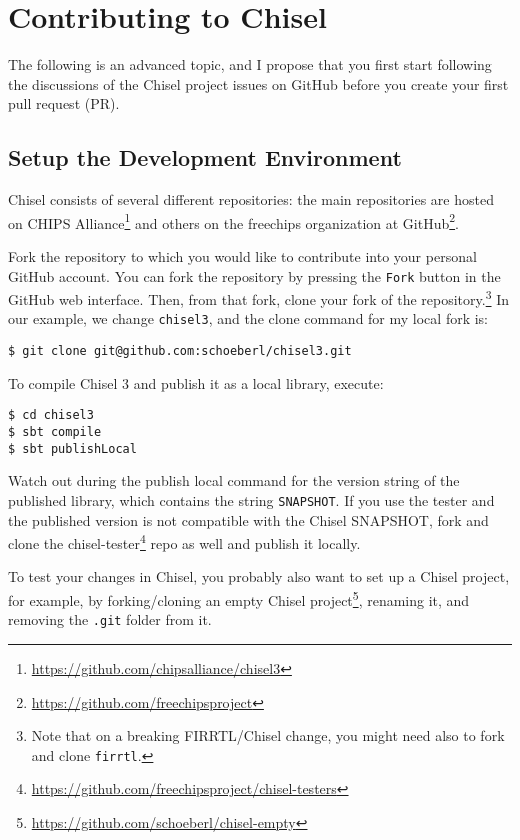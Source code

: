 \documentclass[%
    10pt,
    headinclude, footexclude,
    openright, %
    notitlepage,
    cleardoubleempty,
    headsepline,
    pointlessnumbers,
    bibtotoc, idxtotoc,
    ]{scrbook}
\newcommand{\code}[1]{{\lstinline[basicstyle=\small\ttfamily]{#1}}}
\newcommand{\myref}[2]{\href{#1}{#2}}
\renewcommand{\myref}[2]{{#2}{\footnote{\url{#1}}}}
\begin{document}
\section{Contributing to Chisel}

The following is an advanced topic, and I propose that you first start following the discussions
of the Chisel project issues on GitHub before you create your first pull request (PR).

\subsection{Setup the Development Environment}

Chisel consists of several different repositories: the main repositories are hosted on
\myref{https://github.com/chipsalliance/chisel3}{CHIPS Alliance} and others on
the \myref{https://github.com/freechipsproject}{freechips organization at GitHub}.

Fork the repository to which you would like to contribute into your personal GitHub account.
You can fork the repository by pressing the \code{Fork} button in the GitHub web interface.
Then, from that fork, clone your fork of the repository.\footnote{Note that on a breaking
FIRRTL/Chisel change, you might need also to fork and clone \code{firrtl}.}
In our example, we change \code{chisel3}, and the clone command for my local fork is:

\begin{verbatim}
$ git clone git@github.com:schoeberl/chisel3.git
\end{verbatim}

To compile Chisel 3 and publish it as a local library, execute:
\begin{verbatim}
$ cd chisel3
$ sbt compile
$ sbt publishLocal
\end{verbatim}

Watch out during the publish local command for the version string of the published
library, which contains the string \code{SNAPSHOT}.
If you use the tester and the published version is not compatible with the Chisel
SNAPSHOT, fork and clone the \myref{https://github.com/freechipsproject/chisel-testers}{chisel-tester}
repo as well and publish it locally.

To test your changes in Chisel, you probably also want to set up a Chisel project,
for example, by forking/cloning an \myref{https://github.com/schoeberl/chisel-empty}{empty Chisel project},
renaming it, and removing the \code{.git} folder from it.
\end{document}
